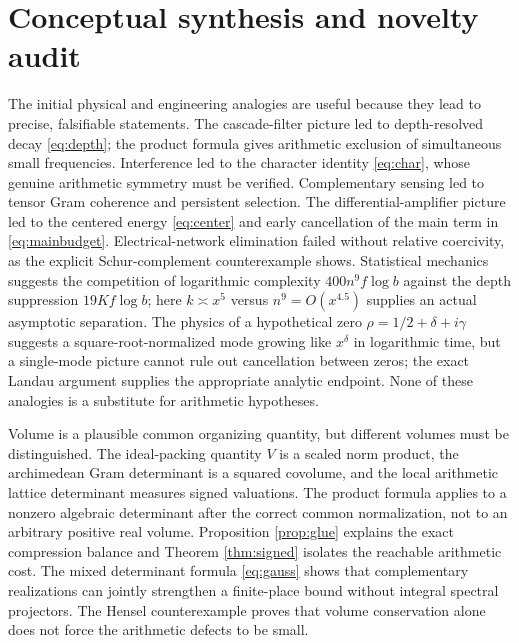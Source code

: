 \documentclass[11pt,a4paper]{article}
\begin{document}
\section{Conceptual synthesis and novelty audit}\label{sec:novelty}
The initial physical and engineering analogies are useful because they lead to precise, falsifiable statements. The cascade-filter picture led to depth-resolved decay \eqref{eq:depth}; the product formula gives arithmetic exclusion of simultaneous small frequencies. Interference led to the character identity \eqref{eq:char}, whose genuine arithmetic symmetry must be verified. Complementary sensing led to tensor Gram coherence and persistent selection. The differential-amplifier picture led to the centered energy \eqref{eq:center} and early cancellation of the main term in \eqref{eq:mainbudget}. Electrical-network elimination failed without relative coercivity, as the explicit Schur-complement counterexample shows. Statistical mechanics suggests the competition of logarithmic complexity $400n^9 f\log b$ against the depth suppression $19Kf\log b$; here $k\asymp x^5$ versus $n^9=O(x^{4.5})$ supplies an actual asymptotic separation. The physics of a hypothetical zero $\rho=1/2+\delta+i\gamma$ suggests a square-root-normalized mode growing like $x^\delta$ in logarithmic time, but a single-mode picture cannot rule out cancellation between zeros; the exact Landau argument supplies the appropriate analytic endpoint. None of these analogies is a substitute for arithmetic hypotheses.

Volume is a plausible common organizing quantity, but different volumes must be distinguished. The ideal-packing quantity $V$ is a scaled norm product, the archimedean Gram determinant is a squared covolume, and the local arithmetic lattice determinant measures signed valuations. The product formula applies to a nonzero algebraic determinant after the correct common normalization, not to an arbitrary positive real volume. Proposition \ref{prop:glue} explains the exact compression balance and Theorem \ref{thm:signed} isolates the reachable arithmetic cost. The mixed determinant formula \eqref{eq:gauss} shows that complementary realizations can jointly strengthen a finite-place bound without integral spectral projectors. The Hensel counterexample proves that volume conservation alone does not force the arithmetic defects to be small.
\end{document}
